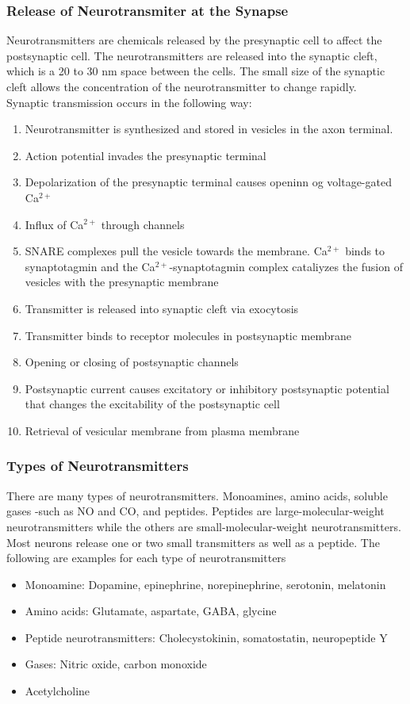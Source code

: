 \subsubsection{Release of Neurotransmiter at the Synapse}
Neurotransmitters are chemicals released by the presynaptic cell to affect the postsynaptic cell. The neurotransmitters are released into the synaptic cleft, which is a 20 to 30 nm space between the cells. The small size of the synaptic cleft allows the concentration of the neurotransmitter to change rapidly. 
\\Synaptic transmission occurs in the following way:
\begin{enumerate}
\item Neurotransmitter is synthesized and stored in vesicles in the axon terminal. 
\item Action potential invades the presynaptic terminal
\item Depolarization of the presynaptic terminal causes openinn og voltage-gated Ca$^{2+}$
\item Influx of Ca$^{2+}$ through channels
\item SNARE complexes pull the vesicle towards the membrane. Ca$^{2+}$ binds to synaptotagmin and the Ca$^{2+}$-synaptotagmin complex cataliyzes the fusion of vesicles with the presynaptic membrane
\item Transmitter is released into synaptic cleft via exocytosis
\item Transmitter binds to receptor molecules in postsynaptic membrane
\item Opening or closing of postsynaptic channels
\item Postsynaptic current causes excitatory or inhibitory postsynaptic potential that changes the excitability of the postsynaptic cell
\item Retrieval of vesicular membrane from plasma membrane
\end{enumerate}

\subsubsection{Types of Neurotransmitters}
There are many types of neurotransmitters. Monoamines, amino acids, soluble gases -such as NO and CO, and peptides. Peptides are large-molecular-weight neurotransmitters while the others are small-molecular-weight neurotransmitters. Most neurons release one or two small transmitters as well as a peptide.
The following are examples for each type of neurotransmitters
\begin{itemize}
\item Monoamine: Dopamine, epinephrine, norepinephrine, serotonin, melatonin
\item Amino acids: Glutamate, aspartate, GABA, glycine
\item Peptide neurotransmitters: Cholecystokinin, somatostatin, neuropeptide Y
\item Gases: Nitric oxide, carbon monoxide
\item Acetylcholine
\end{itemize}

